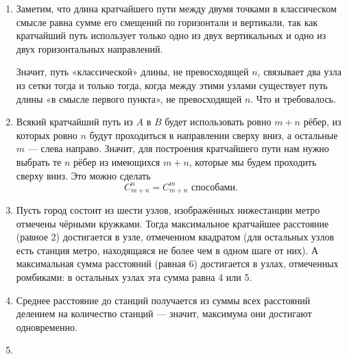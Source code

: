 \begin{enumerate}
\item Заметим, что длина кратчайшего пути между двумя точками в классическом смысле равна сумме его смещений по горизонтали и вертикали, так как кратчайший путь использует только одно из двух вертикальных и одно из двух горизонтальных направлений.

Значит, путь «классической» длины, не превосходящей $n$, связывает два узла из сетки тогда и только тогда, когда между этими узлами существует путь длины «в смысле первого пункта», не превосходящей $n$. Что и требовалось.

\item Всякий кратчайший путь из $A$ в $B$ будет использовать ровно $m+n$ рёбер, из которых ровно $n$ будут проходиться в направлении сверху вниз, а остальные $m$ — слева направо. Значит, для построения кратчайшего пути нам нужно выбрать те $n$ рёбер из имеющихся $m+n$, которые мы будем проходить сверху вниз. Это можно сделать
$$C_{m+n}^n = C_{m+n}^m \text{ способами.}$$

\item Пусть город состоит из шести узлов, изображённых ниже\scolon станции метро отмечены чёрными кружками. Тогда максимальное кратчайшее расстояние (равное 2) достигается в узле, отмеченном квадратом (для остальных узлов есть станция метро, находящаяся не более чем в одном шаге от них). А максимальная сумма расстояний (равная 6) достигается в узлах, отмеченных ромбиками: в остальных узлах эта сумма равна  4 или 5.

\begin{center}  \end{center}

\item Среднее расстояние до станций получается из суммы всех расстояний делением на количество станций — значит, максимума они достигают одновременно.

\item \ \\


\end{enumerate}
